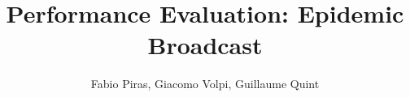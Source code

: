 
\author{Fabio Piras, Giacomo Volpi, Guillaume Quint}
\title{Performance Evaluation: Epidemic Broadcast}


\maketitle

%
%
%
%
%


